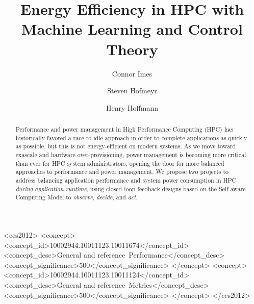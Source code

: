 \documentclass[sigconf,natbib=false]{acmart}
\begin{document}

\title{Energy Efficiency in HPC with Machine Learning and Control Theory}

\author{Connor Imes}

\author{Steven Hofmeyr}

\author{Henry Hoffmann}



\begin{abstract}
Performance and power management in High Performance Computing (HPC) has historically favored a race-to-idle approach in order to complete applications as quickly as possible, but this is not energy-efficient on modern systems.
As we move toward exascale and hardware over-provisioning, power management is becoming more critical than ever for HPC system administrators, opening the door for more balanced approaches to performance and power management.
We propose two projects to address balancing application performance and system power consumption in HPC \emph{during application runtime}, using closed loop feedback designs based on the Self-aware Computing Model to \emph{observe}, \emph{decide}, and \emph{act}.
\end{abstract}

%
%
\begin{CCSXML}
<ccs2012>
  <concept>
    <concept_id>10002944.10011123.10011674</concept_id>
    <concept_desc>General and reference~Performance</concept_desc>
    <concept_significance>500</concept_significance>
  </concept>
  <concept>
    <concept_id>10002944.10011123.10011124</concept_id>
    <concept_desc>General and reference~Metrics</concept_desc>
    <concept_significance>500</concept_significance>
  </concept>
</ccs2012>
\end{CCSXML}
\end{document}
